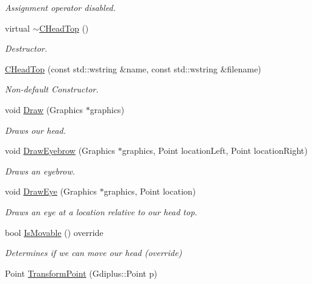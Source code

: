 \begin{DoxyCompactItemize}
\begin{DoxyCompactList}\small\item\em Assignment operator disabled. \end{DoxyCompactList}\item 
virtual \hyperlink{class_c_head_top_a64697c81bc0100f66aa661a8bc430fa9}{$\sim$\+C\+Head\+Top} ()
\begin{DoxyCompactList}\small\item\em Destructor. \end{DoxyCompactList}\item 
\hyperlink{class_c_head_top_a31333179dc1836d6ae5b9636b215b66b}{C\+Head\+Top} (const std\+::wstring \&name, const std\+::wstring \&filename)
\begin{DoxyCompactList}\small\item\em Non-\/default Constructor. \end{DoxyCompactList}\item 
void \hyperlink{class_c_head_top_afd29c8fac9d9d44ad4cc2ef480d26d29}{Draw} (Graphics $\ast$graphics)
\begin{DoxyCompactList}\small\item\em Draws our head. \end{DoxyCompactList}\item 
void \hyperlink{class_c_head_top_a8895e3a21b072f335f7e67992eb3bc54}{Draw\+Eyebrow} (Graphics $\ast$graphics, Point location\+Left, Point location\+Right)
\begin{DoxyCompactList}\small\item\em Draws an eyebrow. \end{DoxyCompactList}\item 
void \hyperlink{class_c_head_top_ad00611870a77e747bf6cb03305b027e6}{Draw\+Eye} (Graphics $\ast$graphics, Point location)
\begin{DoxyCompactList}\small\item\em Draws an eye at a location relative to our head top. \end{DoxyCompactList}\item 
bool \hyperlink{class_c_head_top_a38d98789668f640fa3bbb8352fb54c49}{Is\+Movable} () override
\begin{DoxyCompactList}\small\item\em Determines if we can move our head (override) \end{DoxyCompactList}\item 
Point \hyperlink{class_c_head_top_a631542f2cc871fa17542b3253dc6ab73}{Transform\+Point} (Gdiplus\+::\+Point p)
\item 

\end{DoxyCompactItemize}
